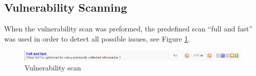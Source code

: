 \subsection{Vulnerability Scanning}
When the vulnerability scan was preformed, the predefined scan “full and fast” was used in order to detect all possible issues, see Figure \ref{fig:vulner}.

\begin{figure}[htb]
  \centering
  \includegraphics[scale=.4]{figures/full_fast}
  \caption{Vulnerability scan} \label{fig:vulner}
\end{figure}

